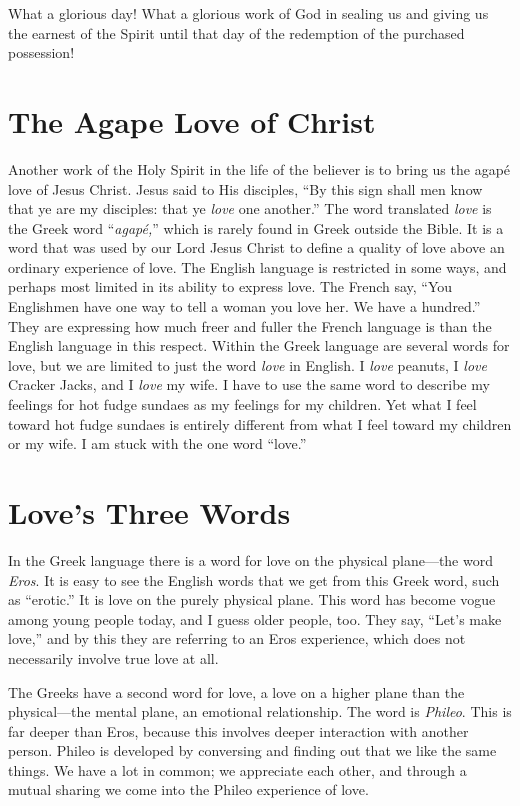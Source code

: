 What a glorious day! What a glorious work of God in 
sealing us and giving us the earnest of the Spirit until that 
day of the redemption of the purchased possession!


\section*{The Agape Love of Christ}

Another work of the Holy Spirit in the life of the believer 
is to bring us the agapé love of Jesus Christ. Jesus said to 
His disciples, “By this sign shall men know that ye are my 
disciples: that ye  \emph{love} one another.” The word translated 
\emph{love} is the Greek word “\emph{agapé,}” which is rarely found in 
Greek outside the Bible. It is a word that was used by our 
Lord Jesus Christ to define a quality of love above an ordinary experience of love. The English language is restricted 
in some ways, and perhaps most limited in its ability to 
express love. The French say, “You Englishmen have one 
way to tell a woman you love her. We have a hundred.” 
They are expressing how much freer and fuller the French 
language is than the English language in this respect. Within 
the Greek language are several words for love, but we are 
limited to just the word \emph{love} in English. I \emph{love} peanuts, I \emph{love}
Cracker Jacks, and I \emph{love} my wife. I have to use the same 
word to describe my feelings for hot fudge sundaes as my 
feelings for my children. Yet what I feel toward hot fudge 
sundaes is entirely different from what I feel toward my 
children or my wife. I am stuck with the one word “love.”


\section*{Love's Three Words}

In the Greek language there is a word for love on the 
physical plane—the word \emph{Eros}. It is easy to see the English 
words that we get from this Greek word, such as “erotic.” It 
is love on the purely physical plane. This word has become 
vogue among young people today, and I guess older people, 
too. They say, “Let’s make love,” and by this they are 
referring to an Eros experience, which does not necessarily 
involve true love at all.

The Greeks have a second word for love, a love on a 
higher plane than the physical—the mental plane,
 an emotional relationship. The word is  \emph{Phileo}. This is far deeper 
than Eros, because this involves deeper interaction with 
another person. Phileo is developed by conversing and 
finding out that we like the same things. We have a lot in 
common; we appreciate each other, and through a mutual 
sharing we come into the Phileo experience of love.

